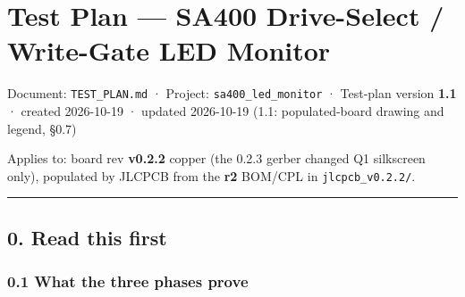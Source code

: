 \documentclass[
  10pt,
]{article}
\author{}
\date{}
\begin{document}
\hypertarget{test-plan-sa400-drive-select-write-gate-led-monitor}{%
\section{Test Plan --- SA400 Drive-Select / Write-Gate LED
Monitor}\label{test-plan-sa400-drive-select-write-gate-led-monitor}}

Document: \texttt{TEST\_PLAN.md} · Project:
\texttt{sa400\_led\_monitor} · Test-plan version
\textbf{1.1} · created 2026-10-19 · updated 2026-10-19 (1.1:
populated-board drawing and legend, §0.7)

Applies to: board rev \textbf{v0.2.2} copper (the 0.2.3
gerber changed Q1 silkscreen only), populated by JLCPCB from
the \textbf{r2} BOM/CPL in \texttt{jlcpcb\_v0.2.2/}.

\begin{center}\rule{0.5\linewidth}{0.5pt}\end{center}

\hypertarget{read-this-first}{%
\subsection{0. Read this first}\label{read-this-first}}

\hypertarget{what-the-three-phases-prove}{%
\subsubsection{0.1 What the three phases
prove}\label{what-the-three-phases-prove}}
\end{document}
